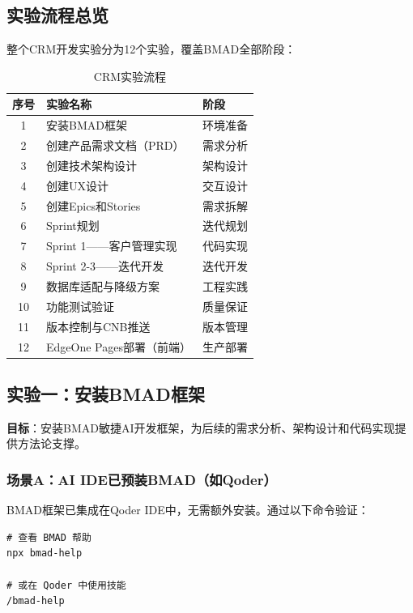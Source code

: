 \subsection{实验流程总览}

整个CRM开发实验分为12个实验，覆盖BMAD全部阶段：

\begin{table}[H]
\centering
\begin{tabular}{cll}
\toprule
\textbf{序号} & \textbf{实验名称} & \textbf{阶段} \\
\midrule
1 & 安装BMAD框架 & 环境准备 \\
2 & 创建产品需求文档（PRD） & 需求分析 \\
3 & 创建技术架构设计 & 架构设计 \\
4 & 创建UX设计 & 交互设计 \\
5 & 创建Epics和Stories & 需求拆解 \\
6 & Sprint规划 & 迭代规划 \\
7 & Sprint 1——客户管理实现 & 代码实现 \\
8 & Sprint 2-3——迭代开发 & 迭代开发 \\
9 & 数据库适配与降级方案 & 工程实践 \\
10 & 功能测试验证 & 质量保证 \\
11 & 版本控制与CNB推送 & 版本管理 \\
12 & EdgeOne Pages部署（前端） & 生产部署 \\
\bottomrule
\end{tabular}
\caption{CRM实验流程}
\end{table}

\subsection{实验一：安装BMAD框架}

\textbf{目标}：安装BMAD敏捷AI开发框架，为后续的需求分析、架构设计和代码实现提供方法论支撑。

\subsubsection*{场景A：AI IDE已预装BMAD（如Qoder）}

BMAD框架已集成在Qoder IDE中，无需额外安装。通过以下命令验证：

\begin{lstlisting}[style=shell]
# 查看 BMAD 帮助
npx bmad-help

# 或在 Qoder 中使用技能
/bmad-help
\end{lstlisting}

